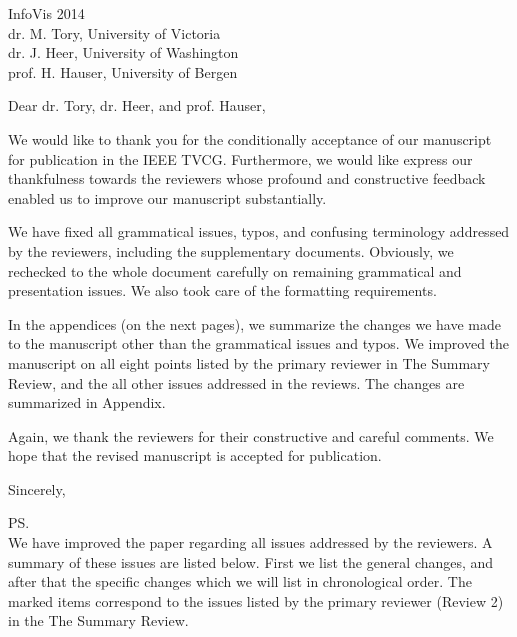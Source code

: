 \documentclass{letter}
\begin{document}
\begin{letter}{InfoVis 2014 \\ dr. M. Tory, University of Victoria \\ dr. J. Heer, University of Washington \\ prof. H. Hauser, University of Bergen}
\opening{Dear dr. Tory, dr. Heer, and prof. Hauser,}

We would like to thank you for the conditionally acceptance of our manuscript for publication in the IEEE TVCG. Furthermore, we would like express our thankfulness towards the reviewers whose profound and constructive feedback enabled us to improve our manuscript substantially.

We have fixed all grammatical issues, typos, and confusing terminology addressed by the reviewers, including the supplementary documents. Obviously, we rechecked to the whole document carefully on remaining grammatical and presentation issues. We also took care of the formatting requirements.

In the appendices (on the next pages), we summarize the changes we have made to the manuscript other than the grammatical issues and typos. We improved the manuscript on all eight points listed by the primary reviewer in The Summary Review, and the all other issues addressed in the reviews. The changes are summarized in Appendix.

Again, we thank the reviewers for their constructive and careful comments. We hope that the revised manuscript is accepted for publication.

\closing{Sincerely,}

\ps
\newpage
{} \\

We have improved the paper regarding all issues addressed by the reviewers. A summary of these issues are listed below.
First we list the general changes, and after that the specific changes which we will list in chronological order. The marked items correspond to the issues listed by the primary reviewer (Review 2) in the The Summary Review.

\bigskip



\end{letter}
\end{document}
